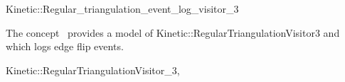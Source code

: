 

\begin{ccRefClass}{Kinetic::Regular_triangulation_event_log_visitor_3}


\ccDefinition
  
The concept \ccRefName\ provides a model of
Kinetic::RegularTriangulationVisitor3 and  which logs edge flip events.


\ccIsModel

Kinetic::RegularTriangulationVisitor\_3, 

\ccSeeAlso



\end{ccRefClass}


